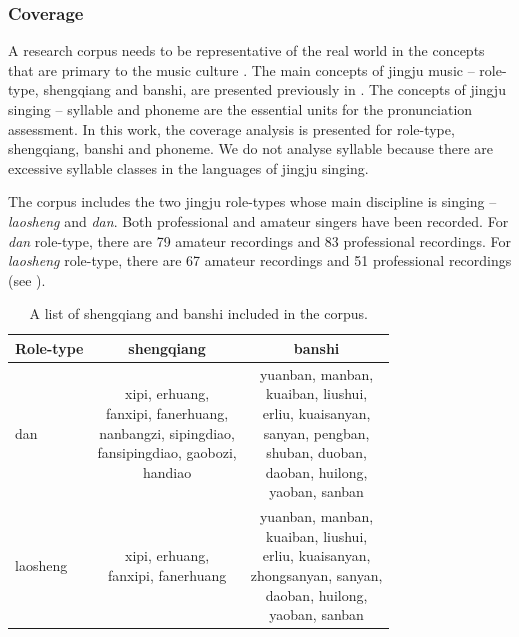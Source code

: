 \subsubsection{Coverage}

A research corpus needs to be representative of the real world in the concepts that are primary to the music culture \cite{Srinivasamurthy2016}. The main concepts of jingju music -- role-type, shengqiang and banshi, are presented previously in . The concepts of jingju singing -- syllable and phoneme are the essential units for the pronunciation assessment. In this work, the coverage analysis is presented for role-type, shengqiang, banshi and phoneme. We do not analyse syllable because there are excessive syllable classes in the languages of jingju singing.

The corpus includes the two jingju role-types whose main discipline is singing -- \textit{laosheng} and \textit{dan}. Both professional and amateur singers have been recorded. For \textit{dan} role-type, there are 79 amateur recordings and 83 professional recordings. For \textit{laosheng} role-type, there are 67 amateur recordings and 51 professional recordings (see ).

\begin{table}[ht]
    \centering
    \begin{tabular}{l|cc}
        \toprule
        Role-type & shengqiang & banshi \\
        \midrule
        dan           & \makecell{xipi, erhuang,\\fanxipi, fanerhuang,\\nanbangzi, sipingdiao,\\fansipingdiao, gaobozi,\\handiao} & \makecell{yuanban, manban,\\kuaiban, liushui,\\erliu, kuaisanyan,\\sanyan, pengban,\\shuban, duoban,\\daoban, huilong,\\yaoban, sanban} \\
	    \hline
	    laosheng      & \makecell{xipi, erhuang,\\fanxipi, fanerhuang} & \makecell{yuanban, manban,\\kuaiban, liushui,\\erliu, kuaisanyan,\\zhongsanyan, sanyan,\\daoban, huilong,\\yaoban, sanban} \\
        \bottomrule
    \end{tabular}
    \caption{A list of shengqiang and banshi included in the corpus.}
    \label{table:ch4:shengqiang_banshi_corpus}
\end{table}

